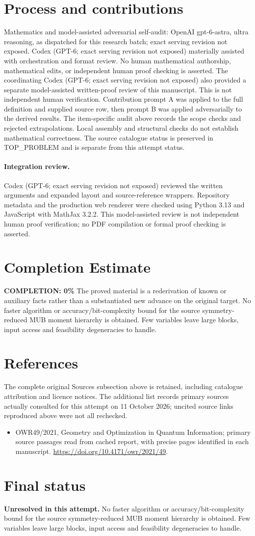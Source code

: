 \documentclass[11pt]{article}
\begin{document}
\section{Process and contributions}
Mathematics and model-assisted adversarial self-audit: OpenAI gpt-6-astra, ultra reasoning, as dispatched for this research batch; exact serving revision not exposed. Codex (GPT-6; exact serving revision not exposed) materially assisted with orchestration and format review. No human mathematical authorship, mathematical edits, or independent human proof checking is asserted.
The coordinating Codex (GPT-6; exact serving revision not exposed) also provided a separate model-assisted written-proof review of this manuscript. This is not independent human verification.
Contribution prompt A was applied to the full definition and supplied source row, then prompt B was applied adversarially to the derived results. The item-specific audit above records the scope checks and rejected extrapolations. Local assembly and structural checks do not establish mathematical correctness. The source catalogue status is preserved in TOP\_PROBLEM and is separate from this attempt status.
\paragraph{Integration review.} Codex (GPT-6; exact serving revision not exposed) reviewed the written arguments and expanded layout and source-reference wrappers. Repository metadata and the production web renderer were checked using Python 3.13 and JavaScript with MathJax 3.2.2. This model-assisted review is not independent human proof verification; no PDF compilation or formal proof checking is asserted.

\section{Completion Estimate}
\noindent\textbf{COMPLETION: 0\%}
The proved material is a rederivation of known or auxiliary facts rather than a substantiated new advance on the original target. No faster algorithm or accuracy/bit-complexity bound for the source symmetry-reduced MUB moment hierarchy is obtained. Few variables leave large blocks, input access and feasibility degeneracies to handle.
\section{References}
The complete original Sources subsection above is retained, including catalogue attribution and licence notices. The additional list records primary sources actually consulted for this attempt on 11 October 2026; uncited source links reproduced above were not all rechecked.
\begin{itemize}
\item OWR49/2021, Geometry and Optimization in Quantum Information; primary source passages read from cached report, with precise pages identified in each manuscript. \url{https://doi.org/10.4171/owr/2021/49}.
\end{itemize}
\section{Final status}
\textbf{Unresolved in this attempt.} No faster algorithm or accuracy/bit-complexity bound for the source symmetry-reduced MUB moment hierarchy is obtained. Few variables leave large blocks, input access and feasibility degeneracies to handle.
\end{document}

